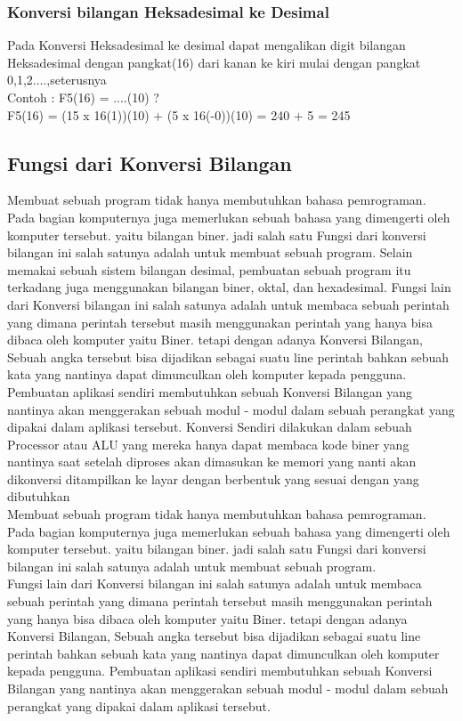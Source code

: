 \subsubsection{Konversi bilangan Heksadesimal ke Desimal}
Pada Konversi Heksadesimal ke desimal dapat mengalikan digit bilangan Heksadesimal dengan pangkat(16) dari kanan ke kiri mulai dengan pangkat 0,1,2....,seterusnya
\\Contoh : F5(16) = ....(10) ?
\\F5(16) = (15 x 16(1))(10) + (5 x 16(-0))(10) = 240 + 5 = 245

\subsection{Fungsi dari Konversi Bilangan}
Membuat sebuah program tidak hanya membutuhkan bahasa pemrograman. Pada bagian komputernya juga memerlukan sebuah bahasa yang dimengerti oleh komputer tersebut. yaitu bilangan biner. jadi salah satu Fungsi dari konversi bilangan ini salah satunya adalah untuk membuat sebuah program. Selain memakai sebuah sistem bilangan desimal, pembuatan sebuah program itu terkadang juga menggunakan bilangan biner, oktal, dan hexadesimal.
Fungsi lain dari Konversi bilangan ini salah satunya adalah untuk membaca sebuah perintah yang dimana perintah tersebut masih menggunakan perintah yang hanya bisa dibaca oleh komputer yaitu Biner. tetapi dengan adanya Konversi Bilangan, Sebuah angka tersebut bisa dijadikan sebagai suatu line perintah bahkan sebuah kata yang nantinya dapat dimunculkan oleh komputer kepada pengguna. Pembuatan aplikasi sendiri membutuhkan sebuah Konversi Bilangan yang nantinya akan menggerakan sebuah modul - modul dalam sebuah perangkat yang dipakai dalam aplikasi tersebut. 
Konversi Sendiri dilakukan dalam sebuah Processor atau ALU yang mereka hanya dapat membaca kode biner yang nantinya saat setelah diproses akan dimasukan ke memori yang nanti akan dikonversi ditampilkan ke layar dengan berbentuk yang sesuai dengan yang dibutuhkan
\\Membuat sebuah program tidak hanya membutuhkan bahasa pemrograman. Pada bagian komputernya juga memerlukan sebuah bahasa yang dimengerti oleh komputer tersebut. yaitu bilangan biner. jadi salah satu Fungsi dari konversi bilangan ini salah satunya adalah untuk membuat sebuah program. 
\\Fungsi lain dari Konversi bilangan ini salah satunya adalah untuk membaca sebuah perintah yang dimana perintah tersebut masih menggunakan perintah yang hanya bisa dibaca oleh komputer yaitu Biner. tetapi dengan adanya Konversi Bilangan, Sebuah angka tersebut bisa dijadikan sebagai suatu line perintah bahkan sebuah kata yang nantinya dapat dimunculkan oleh komputer kepada pengguna. Pembuatan aplikasi sendiri membutuhkan sebuah Konversi Bilangan yang nantinya akan menggerakan sebuah modul - modul dalam sebuah perangkat yang dipakai dalam aplikasi tersebut. 

